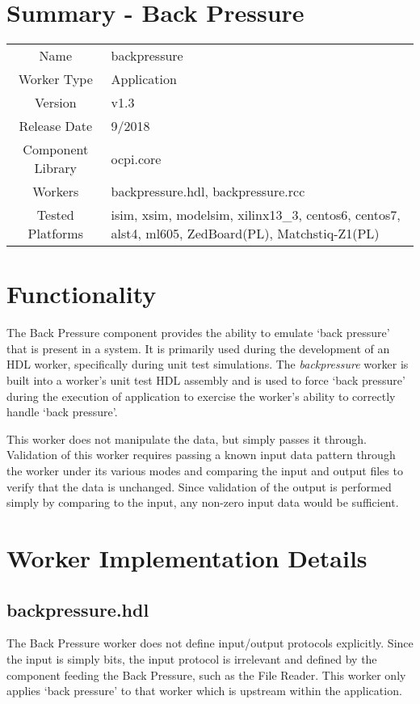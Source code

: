 \documentclass{article}
\author{} %
\date{Version \docVersion} %
\title{\docTitle}
\def\docVersion{1.3}
\def\comp{backpressure}
\def\Comp{Back Pressure}
\begin{document}
\section*{Summary - \Comp}
\begin{tabular}{|c|M{13.5cm}|}
	\hline
	                  &  \\
	\hline
	Name              & \comp  \\
	\hline
	Worker Type       & Application  \\
	\hline
	Version           & v\docVersion  \\
	\hline
	Release Date      & 9/2018  \\
	\hline
	Component Library & ocpi.core  \\
	\hline
	Workers           & \comp.hdl, \comp.rcc  \\
	\hline
	Tested Platforms  & isim, xsim, modelsim, xilinx13\_3, centos6, centos7, alst4, ml605, ZedBoard(PL), Matchstiq-Z1(PL)  \\
	\hline
\end{tabular}

\section*{Functionality}
\begin{flushleft}
	The Back Pressure component provides the ability to emulate `back pressure'
that is present in a system. It is primarily used during the development of an HDL worker,
specifically during unit test simulations. The \textit{backpressure} worker is built
into a worker's unit test HDL assembly and is used to force `back pressure'
during the execution of application to exercise the worker's ability to correctly handle
`back pressure'.\medskip

	This worker does not manipulate the data, but simply passes it through.
Validation of this worker requires passing a known input data pattern
through the worker under its various modes and comparing the input and
output files to verify that the data is unchanged. Since validation of the
output is performed simply by comparing to the input, any non-zero input
data would be sufficient.\medskip
\end{flushleft}

\section*{Worker Implementation Details}
\subsection*{\comp.hdl}
\begin{flushleft}
	The Back Pressure worker does not define input/output protocols explicitly. Since the input is simply bits, the input protocol is irrelevant and defined by the component feeding the Back Pressure, such as the File Reader. This worker only applies `back pressure' to that worker which is upstream within the application.\medskip
\end{flushleft}
\end{document}
